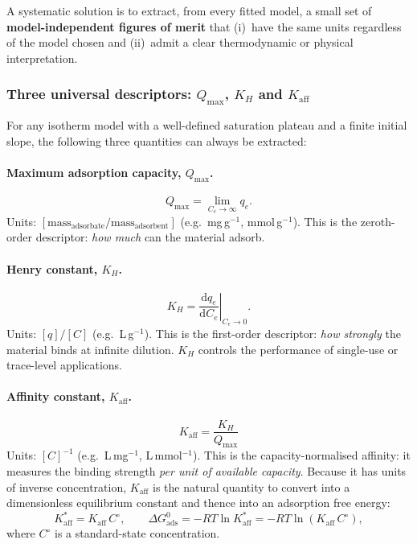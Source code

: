\documentclass[12pt]{article}
\begin{document}
	A systematic solution is to extract, from every fitted model, a
	small set of \textbf{model-independent figures of merit} that
	(i)~have the same units regardless of the model chosen and
	(ii)~admit a clear thermodynamic or physical interpretation.

	\subsubsection{Three universal descriptors: $Q_{\max}$, $K_H$ and $K_{\mathrm{aff}}$}

	For any isotherm model with a well-defined saturation plateau and
	a finite initial slope, the following three quantities can always
	be extracted:

	\paragraph{Maximum adsorption capacity, $Q_{\max}$.}
	\begin{equation}
		Q_{\max} = \lim_{C_e \to \infty} q_e.
		\label{eq:Qmax_universal}
	\end{equation}
	Units: $[\text{mass}_{\text{adsorbate}} / \text{mass}_{\text{adsorbent}}]$
	(e.g.\ mg\,g$^{-1}$, mmol\,g$^{-1}$).
	This is the zeroth-order descriptor: \emph{how much} can the
	material adsorb.

	\paragraph{Henry constant, $K_H$.}
	\begin{equation}
		K_H = \left.\frac{\mathrm{d}q_e}{\mathrm{d}C_e}
		\right|_{C_e \to 0}.
		\label{eq:KH_universal}
	\end{equation}
	Units: $[q]/[C]$ (e.g.\ L\,g$^{-1}$).
	This is the first-order descriptor: \emph{how strongly} the
	material binds at infinite dilution.  $K_H$ controls the
	performance of single-use or trace-level applications.

	\paragraph{Affinity constant, $K_{\mathrm{aff}}$.}
	\begin{equation}
		\boxed{
			K_{\mathrm{aff}}
			= \frac{K_H}{Q_{\max}}
		}
		\label{eq:Kaff_universal}
	\end{equation}
	Units: $[C]^{-1}$ (e.g.\ L\,mg$^{-1}$, L\,mmol$^{-1}$).
	This is the capacity-normalised affinity: it measures the binding
	strength \emph{per unit of available capacity}.  Because it has
	units of inverse concentration, $K_{\mathrm{aff}}$ is the natural
	quantity to convert into a dimensionless equilibrium constant and
	thence into an adsorption free energy:
	\begin{equation}
		K_{\mathrm{aff}}^{\ast}
		= K_{\mathrm{aff}}\, C^\circ,
		\qquad
		\Delta G_{\mathrm{ads}}^{0}
		= -RT\ln K_{\mathrm{aff}}^{\ast}
		= -RT\ln(K_{\mathrm{aff}}\, C^\circ),
		\label{eq:DG_from_Kaff}
	\end{equation}
	where $C^\circ$ is a standard-state concentration.
\end{document}
